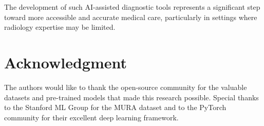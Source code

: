 \documentclass[conference]{IEEEtran}
\begin{document}
The development of such AI-assisted diagnostic tools represents a significant step toward more accessible and accurate medical care, particularly in settings where radiology expertise may be limited.

\section*{Acknowledgment}
The authors would like to thank the open-source community for the valuable datasets and pre-trained models that made this research possible. Special thanks to the Stanford ML Group for the MURA dataset and to the PyTorch community for their excellent deep learning framework.



\end{document}
